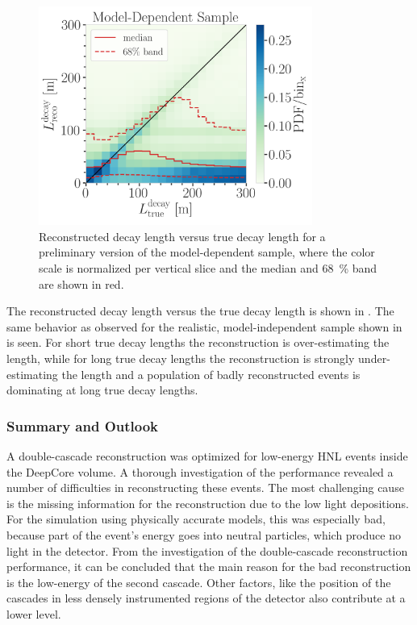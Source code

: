 \begin{figure}[h!]
    \includegraphics[width=0.8\textwidth]{figures/results/190607/resolutions/reco_decayL_vs_true_decayL_final_level_good_step_contours.png}
    \caption[Reconstructed decay length resolution versus true decay length - preliminary model-dependent sample]{Reconstructed decay length versus true decay length for a preliminary version of the model-dependent sample, where the color scale is normalized per vertical slice and the median and \SI{68}{\percent} band are shown in red.}
\end{figure}
The reconstructed decay length versus the true decay length is shown in . The same behavior as observed for the realistic, model-independent sample shown in  is seen. For short true decay lengths the reconstruction is over-estimating the length, while for long true decay lengths the reconstruction is strongly under-estimating the length and a population of badly reconstructed events is dominating at long true decay lengths.


\subsubsection{Summary and Outlook}

A double-cascade reconstruction was optimized for low-energy HNL events inside the DeepCore volume. A thorough investigation of the performance revealed a number of difficulties in reconstructing these events. The most challenging cause is the missing information for the reconstruction due to the low light depositions. For the simulation using physically accurate models, this was especially bad, because part of the event's energy goes into neutral particles, which produce no light in the detector. From the investigation of the double-cascade reconstruction performance, it can be concluded that the main reason for the bad reconstruction is the low-energy of the second cascade. Other factors, like the position of the cascades in less densely instrumented regions of the detector also contribute at a lower level.


